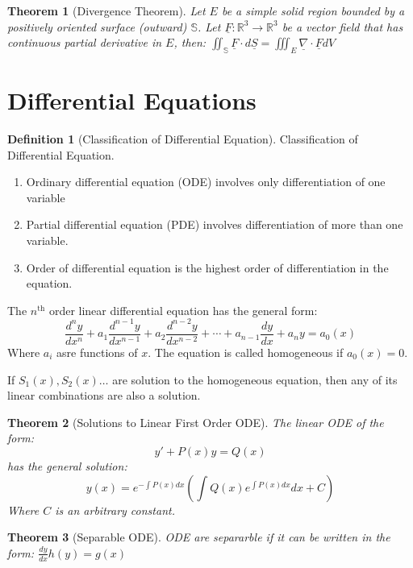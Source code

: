 \documentclass[9pt]{article}
\newtheorem{theorem}{Theorem}[subsection]
\theoremstyle{definition}
\newtheorem{definition}{Definition}[section]
\theoremstyle{remark}
\begin{document}
\begin{theorem}[Divergence Theorem]
Let $E$ be a simple solid region bounded by a positively oriented surface (outward) $\mathbb{S}$.
Let $ \underline{F}: \mathbb{R}^3 \rightarrow \mathbb{R}^3$ be a vector field that has continuous partial derivative in $E$, then:
$
	\iint _{\mathbb{S}} \underline{F} \cdot d\underline{S} = \iiint _{E} \underline{\nabla} \cdot \underline{F} dV
$

\end{theorem}

\section{Differential Equations}
\begin{definition}[Classification of Differential Equation]
Classification of Differential Equation.
	\begin{enumerate}
		\item Ordinary differential equation (ODE) involves only differentiation of one variable
		\item Partial differential equation (PDE) involves differentiation of more than one variable.
		\item Order of differential equation is the highest order of differentiation in the equation.
	\end{enumerate}
The $n^{\text{th}}$ order linear differential equation has the general form:
\[
	\frac{d^n y}{dx^n} + a_1 \frac{d^{n-1} y}{dx^{n-1}} + a_2 \frac{d^{n-2} y}{dx^{n-2}} + \cdots + a_{n-1} \frac{d y}{dx} + a_n y = a_0(x)
\]
Where $a_i$ asre functions of $x$. 
The equation is called homogeneous if $a_0(x) = 0$.

If $S_1(x), S_2(x) \dots $ are solution to the homogeneous equation, then any of its linear combinations are also a solution.
\end{definition}

\begin{theorem}[Solutions to Linear First Order ODE]
The linear ODE of the form:
\[
	y' + P(x)y = Q(x)
\]
has the general solution:
\[
	y(x) = e^{-\int P(x) dx}\left( \int Q(x) e^{\int P(x) dx} dx + C\right)
\]
Where $C$ is an arbitrary constant.

\end{theorem}

\begin{theorem}[Separable ODE]
	ODE are separarble if it can be written in the form:
$
	\frac{dy}{dx} h(y) = g(x)
$
\end{theorem}
\end{document}
